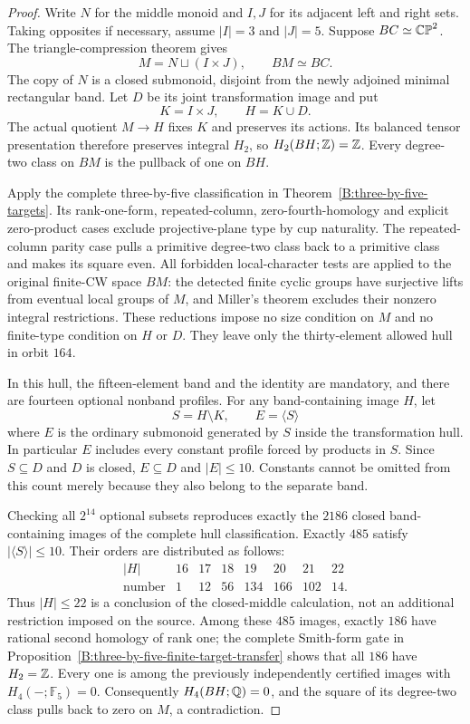 \begin{proof}
Write $N$ for the middle monoid and $I,J$ for its adjacent left
and right sets.  Taking opposites if necessary, assume
$|I|=3$ and $|J|=5$.  Suppose $BC\simeq\mathbb {CP}^2$.
The triangle-compression theorem gives
\[
 M=N\sqcup(I\times J),\qquad BM\simeq BC.
\]
The copy of $N$ is a closed submonoid, disjoint from the newly
adjoined minimal rectangular band.  Let $D$ be its joint
transformation image and put
\[
 K=I\times J,\qquad H=K\cup D.
\]
The actual quotient $M\to H$ fixes $K$ and preserves its
actions.  Its balanced tensor presentation therefore preserves
integral $H_2$, so $H_2(BH;\mathbb Z)=\mathbb Z$.  Every degree-two
class on $BM$ is the pullback of one on $BH$.

Apply the complete three-by-five classification in
Theorem~\ref{B:three-by-five-targets}.  Its rank-one-form,
repeated-column, zero-fourth-homology and explicit zero-product
cases exclude projective-plane type by cup naturality.
The repeated-column parity case pulls a primitive degree-two
class back to a primitive class and makes its square even.
All forbidden local-character tests are applied to the original
finite-CW space $BM$: the detected finite cyclic groups have
surjective lifts from eventual local groups of $M$, and Miller's
theorem excludes their nonzero integral restrictions.
These reductions impose no size condition on $M$ and no
finite-type condition on $H$ or $D$.  They leave only the
thirty-element allowed hull in orbit $164$.

In this hull, the fifteen-element band and the identity are
mandatory, and there are fourteen optional nonband profiles.
For any band-containing image $H$, let
\[
 S=H\setminus K,\qquad E=\langle S\rangle
\]
where $E$ is the ordinary submonoid generated by $S$ inside the
transformation hull.  In particular $E$ includes every constant
profile forced by products in $S$.  Since $S\subseteq D$ and
$D$ is closed, $E\subseteq D$ and $|E|\le10$.
Constants cannot be omitted from this count merely because
they also belong to the separate band.

Checking all $2^{14}$ optional subsets reproduces exactly the
$2186$ closed band-containing images of the complete hull
classification.  Exactly $485$ satisfy $|\langle S\rangle|\le10$.
Their orders are distributed as follows:
\[
\begin{array}{c|rrrrrrr}
 |H|&16&17&18&19&20&21&22\\\hline
 \text{number}&1&12&56&134&166&102&14.
\end{array}
\]
Thus $|H|\le22$ is a conclusion of the closed-middle
calculation, not an additional restriction imposed on the source.
Among these $485$ images, exactly $186$ have rational second
homology of rank one; the complete Smith-form gate in
Proposition~\ref{B:three-by-five-finite-target-transfer}
shows that all $186$ have $H_2=\mathbb Z$.
Every one is among the previously independently certified
images with $H_4(-;\mathbb F_5)=0$.
Consequently $H_4(BH;\mathbb Q)=0$, and the square of its
degree-two class pulls back to zero on $M$, a contradiction.


\end{proof}
